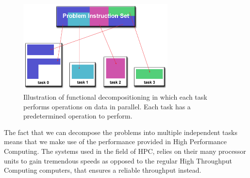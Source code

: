 \begin{figure}[htbp]
\centering
\includegraphics[width=0.7\textwidth]{Analysis/Supercomputing/functional_decomp.png}
\caption{Illustration of functional decompositioning in which each task performs operations on data in parallel. Each task has a predetermined operation to perform. \cite{compLLNL}}\label{fig:fun}
\end{figure}

The fact that we can decompose the problems into multiple independent tasks means that we make use of the performance provided in High Performance Computing. The systems used in the field of HPC, relies on their many processor units to gain tremendous speeds as opposed to the regular High Throughput Computing computers, that ensures a reliable throughput instead.
